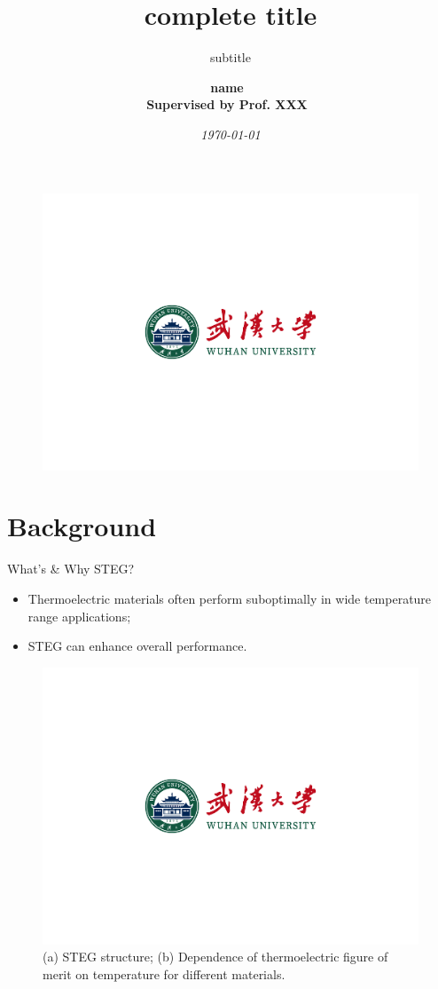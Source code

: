 \documentclass{beamer}
\author[brief name]{\textbf{
    name~\orcidlink{0000-1111-2222-3333}\\
    Supervised by Prof. XXX~\orcidlink{3333-4444-5555-6666}
}}
\title[brief title]{\textbf{complete title}}
\subtitle{subtitle}
\institute{Your Institution}
\date{\textit{\today}}
\begin{document}
\begin{frame}
    \titlepage
    \begin{figure}[htpb]
        \begin{center}
            \includegraphics[width=0.35\linewidth]{pic/dark.pdf}
        \end{center}
    \end{figure}
\end{frame}

\begin{frame}
    \tableofcontents[sectionstyle=show,subsectionstyle=show/shaded/hide,subsubsectionstyle=show/shaded/hide]
\end{frame}


\section{Background}

\begin{frame}{What's \& Why STEG?}
    \small

	\begin{itemize}
		\item {
			Thermoelectric materials often perform suboptimally in wide temperature range applications;
		}
		\item {
			STEG can enhance overall performance.
		}
	\end{itemize}

	\begin{figure}
		\centering
		\includegraphics[scale=0.22]{pic/dark.pdf}
		\captionsetup{font=small}
        \caption{(a) STEG structure; (b) Dependence of thermoelectric figure of merit on temperature for different materials.}
		\label{fig1}
	\end{figure}

\end{frame}
\end{document}
